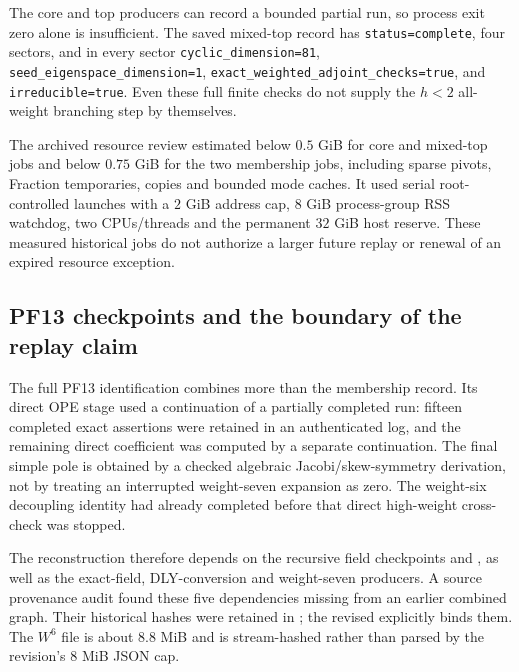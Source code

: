 The core and top producers can record a bounded partial run, so
process exit zero alone is insufficient. The saved mixed-top record
has \texttt{status=complete}, four sectors, and in every sector
\texttt{cyclic\_dimension=81},
\texttt{seed\_eigenspace\_dimension=1},
\texttt{exact\_weighted\_adjoint\_checks=true}, and
\texttt{irreducible=true}. Even these full finite checks do not
supply the $h<2$ all-weight branching step by themselves.

The archived resource review
estimated below $0.5$ GiB for core and mixed-top jobs and below
$0.75$ GiB for the two membership jobs, including sparse pivots,
Fraction temporaries, copies and bounded mode caches. It used
serial root-controlled launches with a $2$ GiB address cap,
$8$ GiB process-group RSS watchdog, two CPUs/threads and the
permanent $32$ GiB host reserve. These measured historical jobs
do not authorize a larger future replay or renewal of an expired
resource exception.

\subsection{PF13 checkpoints and the boundary of the replay claim}

The full PF13 identification combines more than the membership
record. Its direct OPE stage used a continuation of a partially
completed run: fifteen completed exact assertions were retained
in an authenticated log, and the remaining direct coefficient was
computed by a separate continuation. The final simple pole is
obtained by a checked algebraic Jacobi/skew-symmetry derivation,
not by treating an interrupted weight-seven expansion as zero.
The weight-six decoupling identity had already completed before
that direct high-weight cross-check was stopped.

The reconstruction therefore depends on the recursive field
checkpoints
 and
, as well as the
exact-field, DLY-conversion and weight-seven producers. A source
provenance audit found these five dependencies missing from an
earlier combined graph. Their historical hashes were retained in
; the revised
 explicitly
binds them. The $W^6$ file is about $8.8$ MiB and is stream-hashed
rather than parsed by the revision's $8$ MiB JSON cap.

